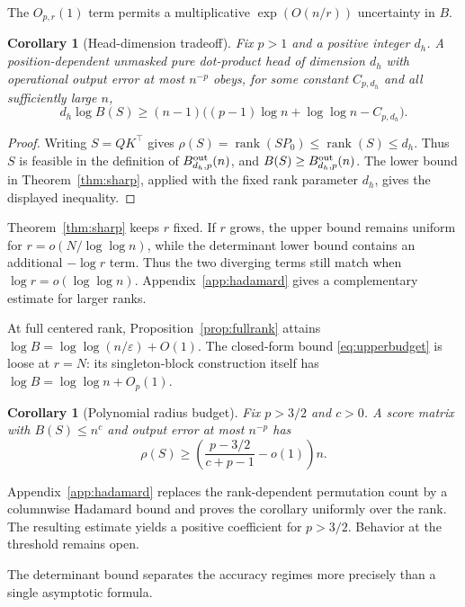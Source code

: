 \documentclass[10pt]{article} %
\newtheorem{corollary}[theorem]{Corollary}
\theoremstyle{definition}
\DeclareMathOperator{\rank}{rank}
\begin{document}
The \(O_{p,r}(1)\) term permits a multiplicative
\(\exp(O(n/r))\) uncertainty in \(B\).

\begin{corollary}[Head-dimension tradeoff]\label{cor:head}
Fix \(p>1\) and a positive integer \(d_h\).  A position-dependent unmasked
pure dot-product
head of dimension
\(d_h\) with operational output error at most \(n^{-p}\) obeys, for some constant
\(C_{p,d_h}\) and all sufficiently large \(n\),
\[
 d_h\log B(S)\ge
 (n-1)\bigl((p-1)\log n+\log\log n-C_{p,d_h}\bigr).
\]
\end{corollary}

\begin{proof}
Writing \(S=QK^\top\) gives
\(\rho(S)=\rank(SP_0)\le\rank(S)\le d_h\).  Thus \(S\) is feasible in the
definition of \(B^{\rm out}_{d_h,p}(n)\), and
\(B(S)\ge B^{\rm out}_{d_h,p}(n)\).  The lower bound in
Theorem~\ref{thm:sharp}, applied with the fixed rank parameter \(d_h\), gives
the displayed inequality.
\end{proof}

Theorem~\ref{thm:sharp} keeps \(r\) fixed.  If \(r\) grows, the upper bound
remains uniform for \(r=o(N/\log\log n)\), while the determinant lower bound
contains an additional \(-\log r\) term.  Thus the two diverging terms still
match when \(\log r=o(\log\log n)\).  Appendix~\ref{app:hadamard} gives a
complementary estimate for larger ranks.

At full centered rank, Proposition~\ref{prop:fullrank} attains
\(\log B=\log\log(n/\varepsilon)+O(1)\).  The closed-form bound
\eqref{eq:upperbudget} is loose at \(r=N\): its singleton-block construction
itself has \(\log B=\log\log n+O_p(1)\).

\begin{corollary}[Polynomial radius budget]\label{cor:budget}
Fix \(p>3/2\) and \(c>0\).  A score matrix with \(B(S)\le n^c\) and output
error at most \(n^{-p}\) has
\[
 \rho(S)\ge
 \left(\frac{p-3/2}{c+p-1}-o(1)\right)n.
\]
\end{corollary}

Appendix~\ref{app:hadamard} replaces the rank-dependent permutation count by
a columnwise Hadamard bound and proves the corollary uniformly over the rank.
The resulting estimate yields a positive coefficient
for \(p>3/2\).  Behavior at the threshold remains open.

The determinant bound separates the accuracy regimes more precisely than a
single asymptotic formula.
\end{document}
